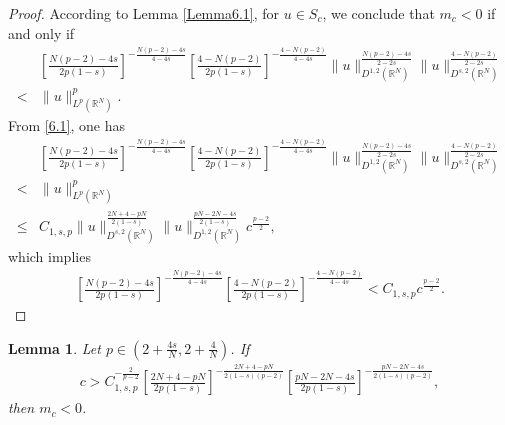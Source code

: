 \documentclass[12pt,a4paper,reqno]{amsart}
\numberwithin{equation}{section}
\newtheorem{lemma}{Lemma}[section]
\begin{document}
\begin{proof}
According to Lemma \ref{Lemma6.1}, for $u\in S_{c}$, we conclude that $m_{c}<0$ if and only if
\begin{equation*}
\begin{aligned}
&
\left[
\frac{N(p-2)-4s}{2p(1-s)}
\right]^{-\frac{N(p-2)-4s}{4-4s}}
\left[
\frac{4-N(p-2)}{2p(1-s)}
\right]^{-\frac{4-N(p-2)}{4-4s}}
\|u\|_{D^{1,2}(\mathbb{R}^{N})}^{\frac{N(p-2)-4s}{2-2s}}
\|u\|_{D^{s,2}(\mathbb{R}^{N})}^{\frac{4-N(p-2)}{2-2s}}\\
<&\|u\|_{L^{p}(\mathbb{R}^{N})}^{p}.
\end{aligned}
\end{equation*}
From \eqref{6.1}, one has
\begin{equation*}
\begin{aligned}
&
\left[
\frac{N(p-2)-4s}{2p(1-s)}
\right]^{-\frac{N(p-2)-4s}{4-4s}}
\left[
\frac{4-N(p-2)}{2p(1-s)}
\right]^{-\frac{4-N(p-2)}{4-4s}}
\|u\|_{D^{1,2}(\mathbb{R}^{N})}^{\frac{N(p-2)-4s}{2-2s}}
\|u\|_{D^{s,2}(\mathbb{R}^{N})}^{\frac{4-N(p-2)}{2-2s}}\\
<&\|u\|_{L^{p}(\mathbb{R}^{N})}^{p}\\
\leqslant& C_{1,s,p}
\|u\|_{D^{s,2}(\mathbb{R}^{N})}^{\frac{2N+4-pN}{2(1-s)}}
\|u\|_{D^{1,2}(\mathbb{R}^{N})}^{\frac{pN-2N-4s}{2(1-s)}}
c^{\frac{p-2}{2}},
\end{aligned}
\end{equation*}
which implies
\begin{equation*}
\begin{aligned}
\left[
\frac{N(p-2)-4s}{2p(1-s)}
\right]^{-\frac{N(p-2)-4s}{4-4s}}
\left[
\frac{4-N(p-2)}{2p(1-s)}
\right]^{-\frac{4-N(p-2)}{4-4s}}
<
C_{1,s,p}c^{\frac{p-2}{2}}.
\end{aligned}
\end{equation*}
\end{proof}

\begin{lemma}\label{Lemma6.4}
Let $p\in(2+\frac{4s}{N},2+\frac{4}{N})$.
If
\begin{equation*}
\begin{aligned}
c> C_{1,s,p}^{-\frac{2}{p-2}}
\left[
\frac{2N+4-pN}{2p(1-s)}
\right]^{-\frac{2N+4-pN}{2(1-s)(p-2)}}
\left[
\frac{pN-2N-4s}{2p(1-s)}
\right]^{-\frac{pN-2N-4s}{2(1-s)(p-2)}},
\end{aligned}
\end{equation*}
then $m_{c}<0$.
\end{lemma}
\end{document}
